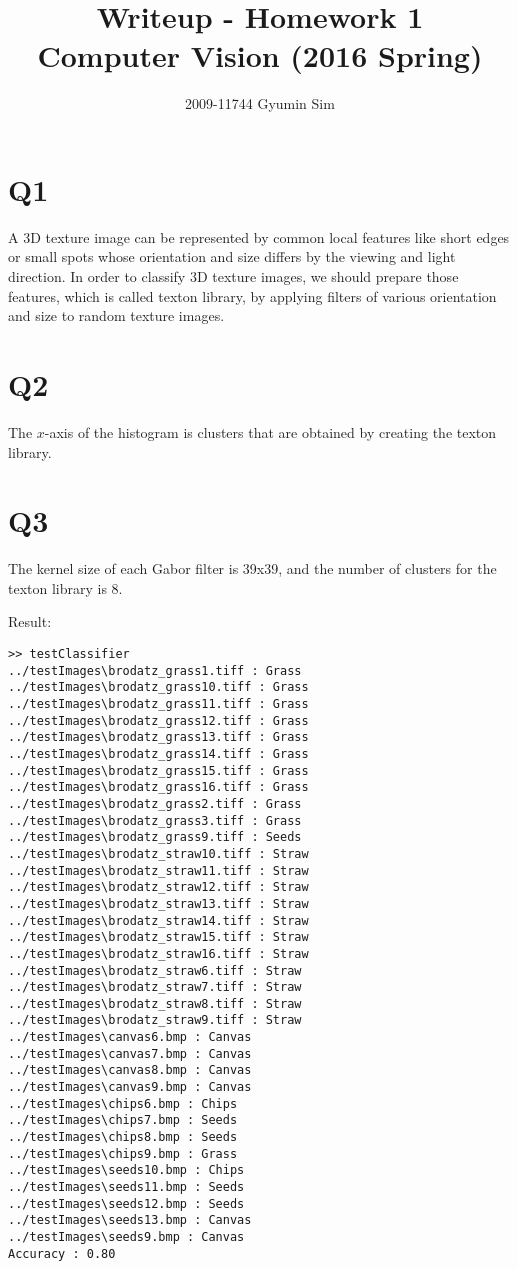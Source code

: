 \documentclass[a4paper,10pt]{article}
\begin{document}
\title{Writeup - Homework 1 \\
  \large Computer Vision (2016 Spring)}
\author{2009-11744 Gyumin Sim}
\maketitle

\section*{Q1}

A 3D texture image can be represented by common local features like short edges or small spots whose orientation and size differs by the viewing and light direction.
In order to classify 3D texture images, we should prepare those features, which is called texton library, by applying filters of various orientation and size to random texture images.

\section*{Q2}

The $x$-axis of the histogram is clusters that are obtained by creating the texton library.

\section*{Q3}

The kernel size of each Gabor filter is 39x39, and the number of clusters for the texton library is 8.

Result:
\begin{lstlisting}[basicstyle=\small]
>> testClassifier
../testImages\brodatz_grass1.tiff : Grass
../testImages\brodatz_grass10.tiff : Grass
../testImages\brodatz_grass11.tiff : Grass
../testImages\brodatz_grass12.tiff : Grass
../testImages\brodatz_grass13.tiff : Grass
../testImages\brodatz_grass14.tiff : Grass
../testImages\brodatz_grass15.tiff : Grass
../testImages\brodatz_grass16.tiff : Grass
../testImages\brodatz_grass2.tiff : Grass
../testImages\brodatz_grass3.tiff : Grass
../testImages\brodatz_grass9.tiff : Seeds
../testImages\brodatz_straw10.tiff : Straw
../testImages\brodatz_straw11.tiff : Straw
../testImages\brodatz_straw12.tiff : Straw
../testImages\brodatz_straw13.tiff : Straw
../testImages\brodatz_straw14.tiff : Straw
../testImages\brodatz_straw15.tiff : Straw
../testImages\brodatz_straw16.tiff : Straw
../testImages\brodatz_straw6.tiff : Straw
../testImages\brodatz_straw7.tiff : Straw
../testImages\brodatz_straw8.tiff : Straw
../testImages\brodatz_straw9.tiff : Straw
../testImages\canvas6.bmp : Canvas
../testImages\canvas7.bmp : Canvas
../testImages\canvas8.bmp : Canvas
../testImages\canvas9.bmp : Canvas
../testImages\chips6.bmp : Chips
../testImages\chips7.bmp : Seeds
../testImages\chips8.bmp : Seeds
../testImages\chips9.bmp : Grass
../testImages\seeds10.bmp : Chips
../testImages\seeds11.bmp : Seeds
../testImages\seeds12.bmp : Seeds
../testImages\seeds13.bmp : Canvas
../testImages\seeds9.bmp : Canvas
Accuracy : 0.80
\end{lstlisting}
\end{document}

